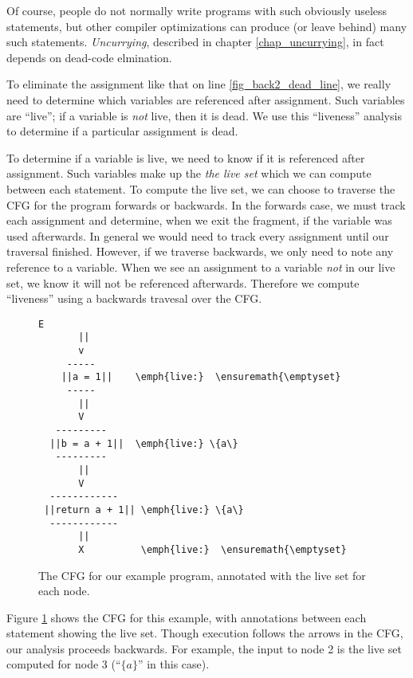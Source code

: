 \documentclass[12pt]{report}
\begin{document}
Of course, people do not normally write programs with such obviously
useless statements, but other compiler optimizations can produce (or
leave behind) many such statements. \emph{Uncurrying}, described in
chapter \ref{chap_uncurrying}, in fact depends on dead-code elmination.

To eliminate the assignment like that on line
\ref{fig_back2_dead_line}, we really need to determine which variables
are referenced after assignment. Such variables are ``live''; if a
variable is \emph{not} live, then it is dead. We use this ``liveness''
analysis to determine if a particular assignment is dead.

To determine if a variable is live, we need to know if it is
referenced after assignment.  Such variables make up the \emph{the
  live set} which we can compute between each statement. To compute
the live set, we can choose to traverse the CFG for the program forwards or
backwards.  In the forwards case, we must track each assignment and
determine, when we exit the fragment, if the variable was used
afterwards. In general we would need to track every assignment until
our traversal finished. However, if we traverse backwards, we only
need to note any reference to a variable. When we see an assignment to
a variable \emph{not} in our live set, we know it will not be
referenced afterwards. Therefore we compute ``liveness'' using a
backwards travesal over the CFG.

\begin{figure}[th]\centering
\figbegin
\begin{minipage}{2in}
\begin{Verbatim}[commandchars=\\\{\}]
       E
       ||      
       v
     -----
    ||a = 1||    \emph{live:}  \ensuremath{\emptyset}
     -----
       ||      
       V
   ---------
  ||b = a + 1||  \emph{live:} \{a\}  
   ---------
       ||      
       V
  ------------
 ||return a + 1|| \emph{live:} \{a\}
  ------------
       ||      
       X          \emph{live:}  \ensuremath{\emptyset}
\end{Verbatim}
\end{minipage}
\caption{The CFG for our example program, annotated with the live
set for each node.}
\label{fig_back3}
\figend
\end{figure}

Figure \ref{fig_back3} shows the CFG for this example, with annotations
between each statement showing the live set. Though
execution follows the arrows in the CFG, our analysis proceeds
backwards. For example, the input to node 2 is the live set computed
for node 3 (``$\{a\}$'' in this case).
\end{document}

